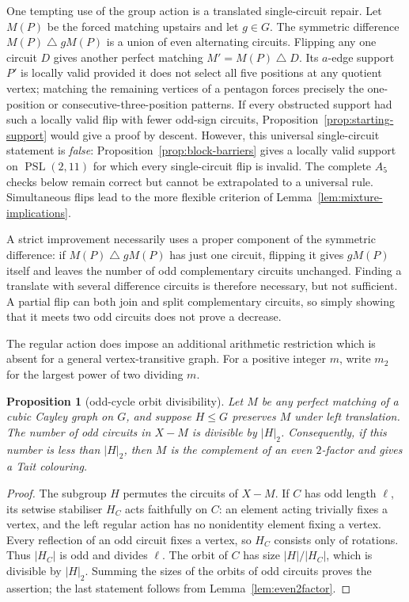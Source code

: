 \documentclass[11pt,a4paper]{article}
\newtheorem{proposition}[theorem]{Proposition}
\theoremstyle{definition}
\theoremstyle{remark}
\newcommand{\PSL}{\operatorname{PSL}}
\begin{document}
One tempting use of the group action is a translated single-circuit repair.  Let $M(P)$ be the forced matching upstairs and let $g\in G$.  The symmetric difference $M(P)\mathbin\triangle gM(P)$ is a union of even alternating circuits.  Flipping any one circuit $D$ gives another perfect matching $M'=M(P)\mathbin\triangle D$.  Its $a$-edge support $P'$ is locally valid provided it does not select all five positions at any quotient vertex; matching the remaining vertices of a pentagon forces precisely the one-position or consecutive-three-position patterns.  If every obstructed support had such a locally valid flip with fewer odd-sign circuits, Proposition~\ref{prop:starting-support} would give a proof by descent.  However, this universal single-circuit statement is \emph{false}: Proposition~\ref{prop:block-barriers} gives a locally valid support on $\PSL(2,11)$ for which every single-circuit flip is invalid.  The complete $A_5$ checks below remain correct but cannot be extrapolated to a universal rule.  Simultaneous flips lead to the more flexible criterion of Lemma~\ref{lem:mixture-implications}.

A strict improvement necessarily uses a proper component of the symmetric difference: if $M(P)\mathbin\triangle gM(P)$ has just one circuit, flipping it gives $gM(P)$ itself and leaves the number of odd complementary circuits unchanged.  Finding a translate with several difference circuits is therefore necessary, but not sufficient.  A partial flip can both join and split complementary circuits, so simply showing that it meets two odd circuits does not prove a decrease.

The regular action does impose an additional arithmetic restriction which is absent for a general vertex-transitive graph.  For a positive integer $m$, write $m_2$ for the largest power of two dividing $m$.
\begin{proposition}[odd-cycle orbit divisibility]\label{prop:orbit-divisibility}
Let $M$ be any perfect matching of a cubic Cayley graph on $G$, and suppose $H\le G$ preserves $M$ under left translation.  The number of odd circuits in $X-M$ is divisible by $|H|_2$.  Consequently, if this number is less than $|H|_2$, then $M$ is the complement of an even $2$-factor and gives a Tait colouring.
\end{proposition}
\begin{proof}
The subgroup $H$ permutes the circuits of $X-M$.  If $C$ has odd length $\ell$, its setwise stabiliser $H_C$ acts faithfully on $C$: an element acting trivially fixes a vertex, and the left regular action has no nonidentity element fixing a vertex.  Every reflection of an odd circuit fixes a vertex, so $H_C$ consists only of rotations.  Thus $|H_C|$ is odd and divides $\ell$.  The orbit of $C$ has size $|H|/|H_C|$, which is divisible by $|H|_2$.  Summing the sizes of the orbits of odd circuits proves the assertion; the last statement follows from Lemma~\ref{lem:even2factor}.
\end{proof}
\end{document}
